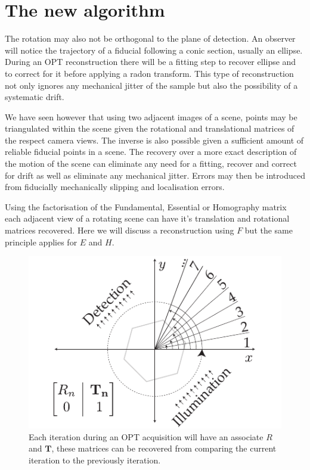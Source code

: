 \section{The new algorithm}

The rotation may also not be orthogonal to the plane of detection.
An observer will notice the trajectory of a fiducial following a conic section, usually an ellipse.
During an OPT reconstruction there will be a fitting step to recover ellipse and to correct for it before applying a radon transform.
This type of reconstruction not only ignores any mechanical jitter of the sample but also the possibility of a systematic drift.

We have seen however that using two adjacent images of a scene, points may be triangulated within the scene given the rotational and translational matrices of the respect camera views.
The inverse is also possible given a sufficient amount of reliable fiducial points in a scene.
The recovery over a more exact description of the motion of the scene can eliminate any need for a fitting, recover and correct for drift as well as eliminate any mechanical jitter.
Errors may then be introduced from fiducially mechanically slipping and localisation errors.

Using the factorisation of the Fundamental, Essential or Homography matrix each adjacent view of a rotating scene can have it's translation and rotational matrices recovered.
Here we will discuss a reconstruction using $F$ but the same principle applies for $E$ and $H$.

\begin{figure}
  \centering
  \includegraphics{Chapters/flopt/Figs/PDF/flOPT_principle}
  \caption{Each iteration during an OPT acquisition will have an associate $R$ and $\mathbf{T}$, these matrices can be recovered from comparing the current iteration to the previously iteration.}
\end{figure}

